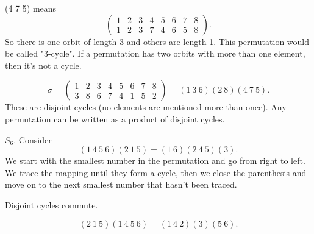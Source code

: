 \documentclass[class=article,crop=false]{standalone}
\begin{document}
\begin{notation}
	(4 7 5) means 
	\[
		\begin{pmatrix} 1&2&3&4&5&6&7&8\\1&2&3&7&4&6&5&8 \end{pmatrix} 
	.\] 
	So there is one orbit of length 3 and others are length 1. This permutation would be called "3-cycle". If a permutation has two orbits with more than one element, then it's not a cycle.
\end{notation}
\begin{eg}[]
\[
	\sigma = \begin{pmatrix} 1&2&3&4&5&6&7&8\\3&8&6&7&4&1&5&2 \end{pmatrix} = (1\ 3\ 6)(2\ 8)(4\ 7\ 5)
.\]
These are disjoint cycles (no elements are mentioned more than once). Any permutation can be written as a product of disjoint cycles.
\end{eg}

\begin{eg}[9.10]
$ S_6$. Consider
\[
	(1\ 4\ 5\ 6)(2\ 1\ 5)=(1\ 6)(2\ 4\ 5 )(3)
.\] 
We start with the smallest number in the permutation and go from right to left. We trace the mapping until they form a cycle, then we close the parenthesis and move on to the next smallest number that hasn't been traced.
\begin{note}[]
Disjoint cycles commute.
\end{note}

\[
	(2\ 1\ 5)(1\ 4\ 5\ 6) = (1\ 4\ 2)(3)(5\ 6)
.\] 

\end{eg}
\end{document}
